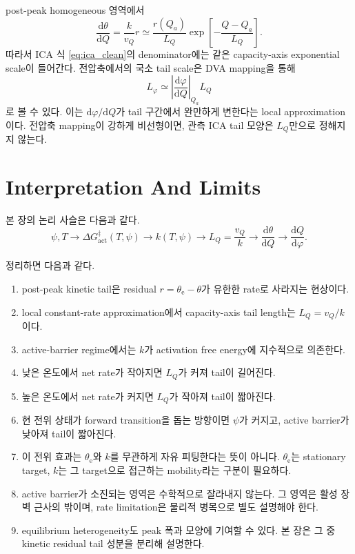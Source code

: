 \documentclass[11pt,a4paper]{article}
\newcommand{\dd}{\mathrm{d}}
\begin{document}
post-peak homogeneous 영역에서
\begin{equation}
\frac{\dd\theta}{\dd Q}
=
\frac{k}{v_Q}r
\simeq
\frac{r(Q_a)}{L_Q}
\exp\!\left[-\frac{Q-Q_a}{L_Q}\right].
\label{eq:dtheta_tail_clean}
\end{equation}
따라서 ICA 식 \eqref{eq:ica_clean}의 denominator에는 같은 capacity-axis exponential scale이 들어간다. 전압축에서의 국소 tail scale은 DVA mapping을 통해
\begin{equation}
\boxed{
L_\varphi
\simeq
\left|
\frac{\dd\varphi}{\dd Q}
\right|_{Q_a}
L_Q
}
\label{eq:Lphi_clean}
\end{equation}
로 볼 수 있다. 이는 \(\dd\varphi/\dd Q\)가 tail 구간에서 완만하게 변한다는 local approximation이다. 전압축 mapping이 강하게 비선형이면, 관측 ICA tail 모양은 \(L_Q\)만으로 정해지지 않는다.

\section{Interpretation And Limits}

본 장의 논리 사슬은 다음과 같다.
\[
\psi,T
\rightarrow
\Delta G_{\mathrm{act}}^\ddagger(T,\psi)
\rightarrow
k(T,\psi)
\rightarrow
L_Q=\frac{v_Q}{k}
\rightarrow
\frac{\dd\theta}{\dd Q}
\rightarrow
\frac{\dd Q}{\dd\varphi}.
\]

정리하면 다음과 같다.

\begin{enumerate}
\item post-peak kinetic tail은 residual \(r=\theta_{\mathrm e}-\theta\)가 유한한 rate로 사라지는 현상이다.
\item local constant-rate approximation에서 capacity-axis tail length는 \(L_Q=v_Q/k\)이다.
\item active-barrier regime에서는 \(k\)가 activation free energy에 지수적으로 의존한다.
\item 낮은 온도에서 net rate가 작아지면 \(L_Q\)가 커져 tail이 길어진다.
\item 높은 온도에서 net rate가 커지면 \(L_Q\)가 작아져 tail이 짧아진다.
\item 현 전위 상태가 forward transition을 돕는 방향이면 \(\psi\)가 커지고, active barrier가 낮아져 tail이 짧아진다.
\item 이 전위 효과는 \(\theta_{\mathrm e}\)와 \(k\)를 무관하게 자유 피팅한다는 뜻이 아니다. \(\theta_{\mathrm e}\)는 stationary target, \(k\)는 그 target으로 접근하는 mobility라는 구분이 필요하다.
\item active barrier가 소진되는 영역은 수학적으로 잘라내지 않는다. 그 영역은 활성 장벽 근사의 밖이며, rate limitation은 물리적 병목으로 별도 설명해야 한다.
\item equilibrium heterogeneity도 peak 폭과 모양에 기여할 수 있다. 본 장은 그 중 kinetic residual tail 성분을 분리해 설명한다.
\end{enumerate}
\end{document}
